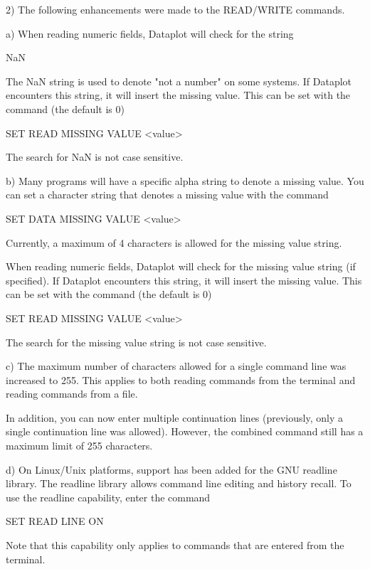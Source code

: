 { 2) The following enhancements were made to the READ/WRITE commands.

    a) When reading numeric fields, Dataplot will check for
       the string

           NaN

       The NaN string is used to denote "not a number" on some
       systems.  If Dataplot encounters this string, it will
       insert the missing value.  This can be set with the
       command (the default is 0)

            SET READ MISSING VALUE  <value>

       The search for NaN is not case sensitive.

    b) Many programs will have a specific alpha string to denote
       a missing value.  You can set a character string that
       denotes a missing value with the command

            SET DATA MISSING VALUE  <value>

       Currently, a maximum of 4 characters is allowed for the
       missing value string.

       When reading numeric fields, Dataplot will check for the
       missing value string (if specified).  If Dataplot encounters
       this string, it will insert the missing value.  This can be set
       with the command (the default is 0)

            SET READ MISSING VALUE  <value>

       The search for the missing value string is not case sensitive.

    c) The maximum number of characters allowed for a single command
       line was increased to 255.  This applies to both reading
       commands from the terminal and reading commands from a file.

       In addition, you can now enter multiple continuation lines
       (previously, only a single continuation line was allowed).
       However, the combined command still has a maximum limit of
       255 characters.

    d) On Linux/Unix platforms, support has been added for the
       GNU readline library.  The readline library allows command
       line editing and history recall.  To use the readline
       capability, enter the command

          SET READ LINE ON

       Note that this capability only applies to commands that
       are entered from the terminal.

}
